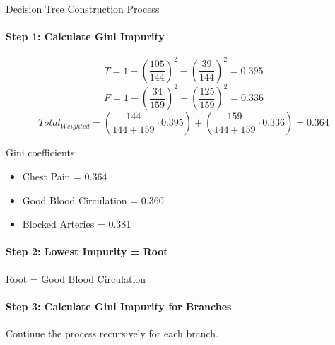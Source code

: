 \begin{KR}{Decision Tree Construction Process}\\
\paragraph{Step 1: Calculate Gini Impurity}
$$T = 1 - \left(\frac{105}{144}\right)^2 - \left(\frac{39}{144}\right)^2 = 0.395$$
$$F = 1 - \left(\frac{34}{159}\right)^2 - \left(\frac{125}{159}\right)^2 = 0.336$$
$$Total_{Weighted} = \left(\frac{144}{144 + 159} \cdot 0.395\right) + \left(\frac{159}{144 + 159} \cdot 0.336\right) = 0.364$$

Gini coefficients:
\begin{itemize}
    \item Chest Pain = 0.364
    \item Good Blood Circulation = 0.360
    \item Blocked Arteries = 0.381
\end{itemize}

\paragraph{Step 2: Lowest Impurity = Root}
Root = Good Blood Circulation

\paragraph{Step 3: Calculate Gini Impurity for Branches}
Continue the process recursively for each branch.
\end{KR}


